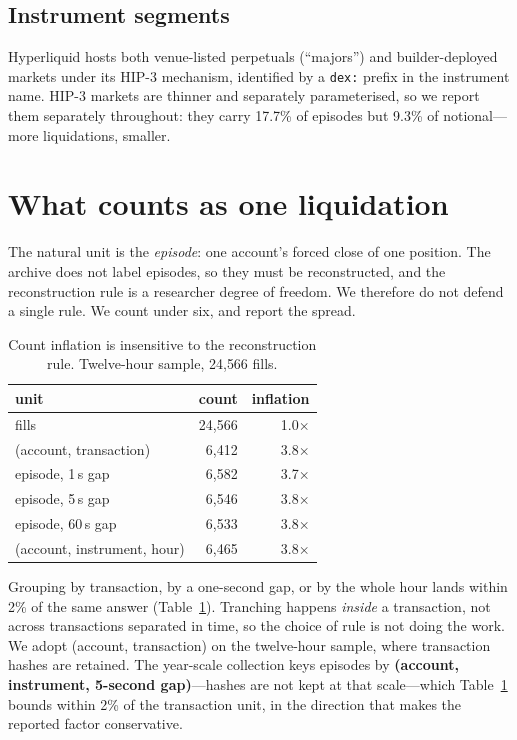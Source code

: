 \documentclass[11pt,a4paper]{article}
\begin{document}
\subsection{Instrument segments}

Hyperliquid hosts both venue-listed perpetuals (``majors'') and builder-deployed markets under
its HIP-3 mechanism, identified by a \texttt{dex:} prefix in the instrument name. HIP-3 markets
are thinner and separately parameterised, so we report them separately throughout: they carry
17.7\% of episodes but 9.3\% of notional---more liquidations, smaller.

\section{What counts as one liquidation}
\label{sec:unit}

The natural unit is the \emph{episode}: one account's forced close of one position. The archive
does not label episodes, so they must be reconstructed, and the reconstruction rule is a
researcher degree of freedom. We therefore do not defend a single rule. We count under six, and
report the spread.

\begin{table}[htbp]
\centering
\caption{Count inflation is insensitive to the reconstruction rule. Twelve-hour sample,
24{,}566 fills.}
\label{tab:units}
\begin{tabular}{lrr}
\toprule
unit & count & inflation \\
\midrule
fills & 24{,}566 & 1.0$\times$ \\
(account, transaction) & 6{,}412 & 3.8$\times$ \\
episode, 1\,s gap & 6{,}582 & 3.7$\times$ \\
episode, 5\,s gap & 6{,}546 & 3.8$\times$ \\
episode, 60\,s gap & 6{,}533 & 3.8$\times$ \\
(account, instrument, hour) & 6{,}465 & 3.8$\times$ \\
\bottomrule
\end{tabular}
\end{table}

Grouping by transaction, by a one-second gap, or by the whole hour lands within 2\% of the same
answer (Table~\ref{tab:units}). Tranching happens \emph{inside} a transaction, not across
transactions separated in time, so the choice of rule is not doing the work. We adopt
(account, transaction) on the twelve-hour sample, where transaction hashes are retained. The
year-scale collection keys episodes by \textbf{(account, instrument, 5-second gap)}---hashes
are not kept at that scale---which Table~\ref{tab:units} bounds within 2\% of the transaction
unit, in the direction that makes the reported factor conservative.
\end{document}
